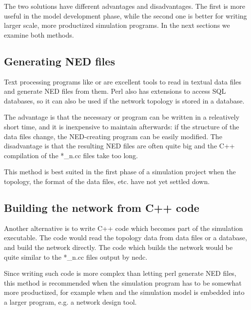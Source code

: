 The two solutions have different advantages and disadvantages. 
The first is more useful in the model development phase, while 
the second one is better for writing larger scale, more productized 
simulation programs. In the next sections we examine both methods.




\subsection{Generating NED files}


Text processing programs like  or  are
excellent tools to read in textual data files and generate NED files
from them.  Perl also has extensions to
access SQL databases, so it can also be used if the network topology
is stored in a database.

The advantage is that the necessary  or 
program can be written in a releatively short time, and it is
inexpensive to maintain afterwards: if the structure of the data files
change, the NED-creating program can be easily modified. The
disadvantage is that the resulting NED files are often quite big and
the C++ compilation of the *\_n.cc files take too long.

This method is best suited in the first phase of a simulation 
project when the topology, the format of the data files, etc. 
have not yet settled down.





\subsection{Building the network from C++ code}

Another alternative is to write C++ code which becomes part of the
simulation executable. The code would read the topology data from data
files or a database, and build the network directly.  The code which
builds the network would be quite similar to the *\_n.cc files output
by nedc.


Since writing such code is more complex than letting perl generate 
NED files, this method is recommended when the simulation program 
has to be somewhat more productized, for example when {\opp} 
and the simulation model is embedded into a larger program, e.g. 
a network design tool.


